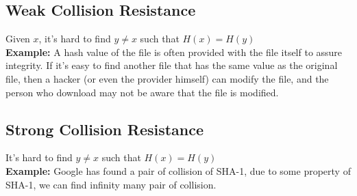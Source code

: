 \documentclass[12pt,a4paper]{article}
\begin{document}
\subsection{Weak Collision Resistance}
    Given $x$, it's hard to find $y\neq x$ such that $H(x)=H(y)$\\
    \textbf{Example:} A hash value of the file is often provided with the file itself to assure integrity. If it's easy to find another file that has the same value as the original file, then a hacker (or even the provider himself) can modify the file, and the person who download may not be aware that the file is modified.
\subsection{Strong Collision Resistance}
    It's hard to find $y\neq x$ such that $H(x)=H(y)$\\
    \textbf{Example:} Google has found a pair of collision of SHA-1, due to some property of SHA-1, we can find infinity many pair of collision.
\end{document}
